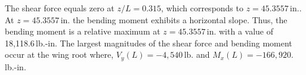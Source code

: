 \documentclass{AeroStructure-ERJohnson}
\begin{document}
\begin{example}
{\def\thefigure{4.6}
}


\noindent The shear force equals zero at $z/L=0.315$, which corresponds to $z=45.3557\,\textrm{in}.$. At $z=45.3557\,\textrm{in}.$ the bending moment exhibits a horizontal slope. Thus, the bending moment is a relative maximum at $z=45.3557\,\textrm{in}.$ with a value of 18,118.6\,lb.-in. The largest magnitudes of the shear force and bending moment occur at the wing root where, $V_{y}(L)=-4{,}540\,\textrm{lb.}$ and $M_{x}(L)= -166{,}920$.\,lb.-in.
\end{example}

{\def\thefigure{4.7}
}

\vspace*{-20pt}
\end{document}
